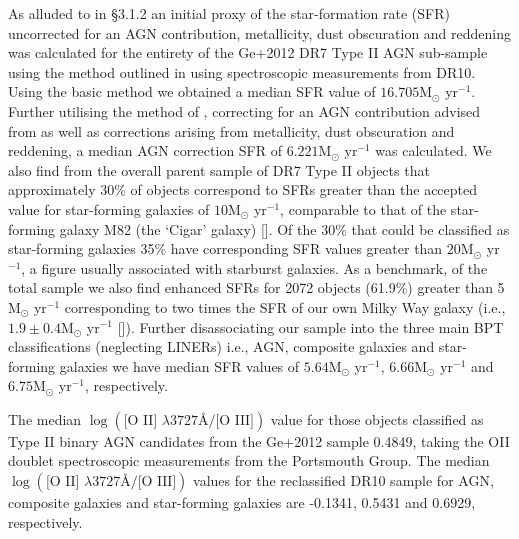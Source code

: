 As alluded to in §3.1.2 an initial proxy of the star-formation rate (SFR) uncorrected for an AGN contribution, metallicity, dust obscuration and reddening was calculated for the entirety of the Ge+2012 DR7 Type II AGN sub-sample using the method outlined in \cite{Kennicutt_1998} using spectroscopic measurements from DR10. Using the basic \cite{Kennicutt_1998} method we obtained a median SFR value of $16.705\text{M}_{\odot}$ yr$^{-1}$. Further utilising the method of \cite{Kewley_2004}, correcting for an AGN contribution advised from \cite{2006ApJ...642..702K} as well as corrections arising from metallicity, dust obscuration and reddening, a median AGN correction SFR of $6.221\text{M}_{\odot}$ yr$^{-1}$ was calculated. We also find from the overall parent sample of DR7 Type II objects that approximately 30\% of objects correspond to SFRs greater than the accepted value for star-forming galaxies of $10\text{M}_{\odot}$ yr$^{-1}$, comparable to that of the star-forming galaxy M82 (the ‘Cigar’ galaxy) [\cite{2009ApJ...706.1364F}]. Of the 30\% that could be classified as star-forming galaxies 35\% have corresponding SFR values greater than $20\text{M}_{\odot}$ yr$^{-1}$, a figure usually associated with starburst galaxies. As a benchmark, of the total sample we also find enhanced SFRs for 2072 objects (61.9\%) greater than 5 M$_{\odot}$ yr$^{-1}$ corresponding to two times the SFR of our own Milky Way galaxy (i.e., $1.9\pm{0.4}\text{M}_{\odot}$ yr$^{-1}$ [\cite{2011AJ....142..197C}]). Further disassociating our sample into the three main BPT classifications (neglecting LINERs) i.e., AGN, composite galaxies and star-forming galaxies we have median SFR values of $5.64\text{M}_{\odot}$ yr$^{-1}$, $6.66\text{M}_{\odot}$ yr$^{-1}$ and $6.75\text{M}_{\odot}$ yr$^{-1}$, respectively. 

The median $\log{(\text{[O II] }{\lambda}3727Å\text{/[O III]})}$ value for those objects classified as Type II binary AGN candidates from the Ge+2012 sample 0.4849, taking the OII doublet spectroscopic measurements from the Portsmouth Group. The median $\log{(\text{[O II] }{\lambda}3727Å\text{/[O III]})}$ values for the reclassified DR10 sample for AGN, composite galaxies and star-forming galaxies are -0.1341, 0.5431 and 0.6929, respectively.      